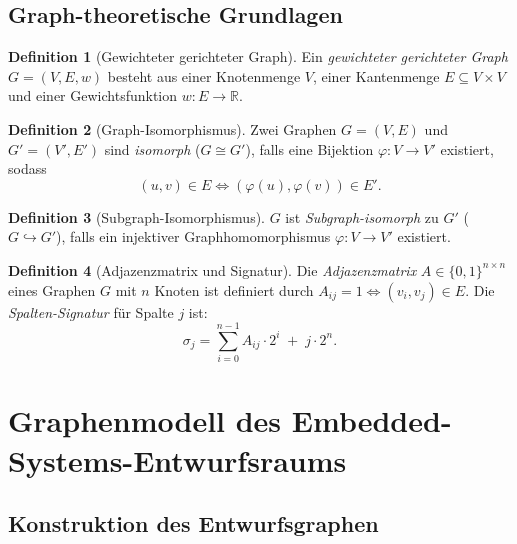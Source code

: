 ﻿\documentclass[a4paper,12pt]{article}
\theoremstyle{definition}
\newtheorem{definition}{Definition}
\begin{document}
\subsection{Graph-theoretische Grundlagen}

\begin{definition}[Gewichteter gerichteter Graph]
    Ein \emph{gewichteter gerichteter Graph} $G = (V, E, w)$ besteht aus einer
    Knotenmenge $V$, einer Kantenmenge $E \subseteq V \times V$ und einer
    Gewichtsfunktion $w: E \to \mathbb{R}$.
\end{definition}

\begin{definition}[Graph-Isomorphismus]
    Zwei Graphen $G = (V, E)$ und $G' = (V', E')$ sind \emph{isomorph}
    ($G \cong G'$), falls eine Bijektion $\varphi: V \to V'$ existiert, sodass
    \[
        (u, v) \in E \iff (\varphi(u), \varphi(v)) \in E'.
    \]
\end{definition}

\begin{definition}[Subgraph-Isomorphismus]
    $G$ ist \emph{Subgraph-isomorph} zu $G'$ ($G \hookrightarrow G'$), falls
    ein injektiver Graphhomomorphismus $\varphi: V \to V'$ existiert.
\end{definition}

\begin{definition}[Adjazenzmatrix und Signatur]\label{def:sig}
    Die \emph{Adjazenzmatrix} $A \in \{0,1\}^{n \times n}$ eines Graphen $G$
    mit $n$ Knoten ist definiert durch $A_{ij} = 1 \iff (v_i, v_j) \in E$.
    Die \emph{Spalten-Signatur} f\"{u}r Spalte $j$ ist:
    \[
        \sigma_j = \sum_{i=0}^{n-1} A_{ij} \cdot 2^i \;+\; j \cdot 2^n.
    \]
\end{definition}

\section{Graphenmodell des Embedded-Systems-Entwurfsraums}

\subsection{Konstruktion des Entwurfsgraphen}
\end{document}
